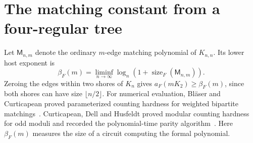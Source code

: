 \documentclass[11pt]{article}
\theoremstyle{remark}
\newcommand{\Match}{\mathsf M}
\newcommand{\sizeF}{\operatorname{size}_F}
\begin{document}
\section{The matching constant from a four-regular tree}\label{matchsec}
Let $\Match_{n,m}$ denote the ordinary $m$-edge matching polynomial of $K_{n,n}$. Its lower host exponent is
\[
 \beta_F(m)=\liminf_{n\to\infty}\log_n(1+\sizeF(\Match_{n,m})).
\]
Zeroing the edges within two shores of $K_n$ gives $a_F(mK_2)\ge\beta_F(m)$, since both shores can have size $\lfloor n/2\rfloor$.
For numerical evaluation, Bl\"aser and Curticapean proved parameterized counting hardness for weighted bipartite matchings~\cite{bc}. Curticapean, Dell and Husfeldt proved modular counting hardness for odd moduli and recorded the polynomial-time parity algorithm~\cite{cdh}. Here $\beta_F(m)$ measures the size of a circuit computing the formal polynomial.
\end{document}
